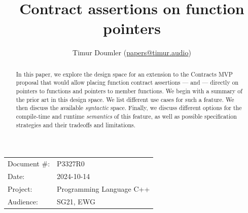 

 \usepackage[bottom]{footmisc} 

 \usepackage{longtable}


\usepackage{tikz,lipsum,lmodern}
\usepackage[most]{tcolorbox}



\usepackage{titlesec}
\usepackage{tocloft}


\newcommand{\changelocaltocdepth}[1]{%
  \addtocontents{toc}{\protect\setcounter{tocdepth}{#1}}%
  \setcounter{tocdepth}{#1}%
}

\setcounter{tocdepth}{3}



\title{Contract assertions on function pointers}
\author{ Timur Doumler \small(\href{mailto:papers@timur.audio}{papers@timur.audio}) 
}
\date{}
\maketitle

\begin{tabular}{ll}
Document \#: & P3327R0 \\
Date: &2024-10-14 \\
Project: & Programming Language C++ \\
Audience: & SG21, EWG
\end{tabular}

\begin{abstract}
In this paper, we explore the design space for an extension to the Contracts MVP proposal \cite{P2900R8} that would allow placing function contract assertions ---  and  --- directly on pointers to functions and pointers to member functions. We begin  with a summary of the prior art in this design space. We list different use cases for such a feature. We then discuss the available \emph{syntactic} space. Finally, we discuss different  options for the compile-time and runtime \emph{semantics} of this feature, as well as possible specification strategies and their tradeoffs and limitations.
\end{abstract}

